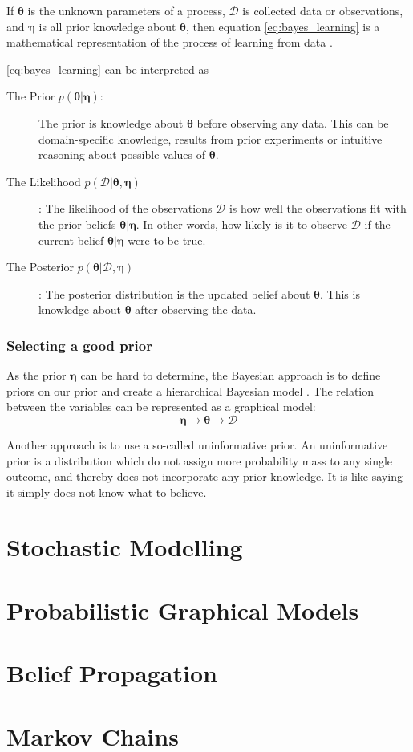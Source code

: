 If $\boldsymbol{\theta}$ is the unknown parameters of a process, $\mathcal{D}$ is collected data or observations, and $\boldsymbol{\eta}$ is all prior knowledge about $\boldsymbol{\theta}$, then equation \eqref{eq:bayes_learning} is a mathematical representation of the process of learning from data \cite{Jaynes86bayesianmethods:}.

\cref{eq:bayes_learning} can be interpreted as
\begin{description}
    \item[The Prior $p(\boldsymbol{\theta} | \boldsymbol{\eta})$:] The prior is knowledge about $\boldsymbol{\theta}$ before observing any data. This can be domain-specific knowledge, results from prior experiments or intuitive reasoning about possible values of $\boldsymbol{\theta}$. 
    \item[The Likelihood $p(\mathcal{D} | \boldsymbol{\theta}, \boldsymbol{\eta})$]: The likelihood of the observations $\mathcal{D}$ is how well the observations fit with the prior beliefs $\boldsymbol{\theta} | \boldsymbol{\eta}$. In other words, how likely is it to observe $\mathcal{D}$ if the current belief $\boldsymbol{\theta} | \boldsymbol{\eta}$ were to be true.
    \item[The Posterior $p(\boldsymbol{\theta} | \mathcal{D}, \boldsymbol{\eta})$]: The posterior distribution is the updated belief about $\boldsymbol{\theta}$. This is knowledge about $\boldsymbol{\theta}$ after observing the data. 
\end{description}

\subsubsection{Selecting a good prior}
As the prior $\boldsymbol{\eta}$ can be hard to determine, the Bayesian approach is to define priors on our prior and create a hierarchical Bayesian model \cite{murphy}. The relation between the variables can be represented as a graphical model:
\begin{equation*}
    \boldsymbol{\eta} \rightarrow \boldsymbol{\theta} \rightarrow{\mathcal{D}}
\end{equation*}

Another approach is to use a so-called uninformative prior. An uninformative prior is a distribution which do not assign more probability mass to any single outcome, and thereby does not incorporate any prior knowledge. It is like saying it simply does not know what to believe.





\section{Stochastic Modelling}

\section{Probabilistic Graphical Models}

\section{Belief Propagation}

\section{Markov Chains}

